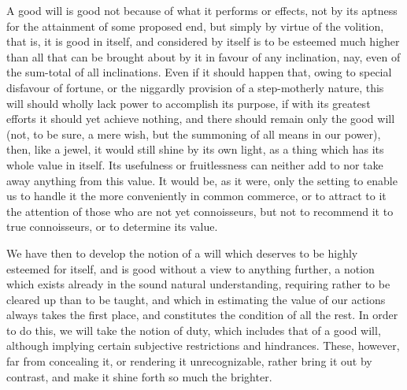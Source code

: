 A good will is good not because of what it performs or effects, not by
its aptness for the attainment of some proposed end, but simply by
virtue of the volition, that is, it is good in itself, and considered
by itself is to be esteemed much higher than all that can be brought
about by it in favour of any inclination, nay, even of the sum-total
of all inclinations. Even if it should happen that, owing to special
disfavour of fortune, or the niggardly provision of a step-motherly
nature, this will should wholly lack power to accomplish its purpose,
if with its greatest efforts it should yet achieve nothing, and there
should remain only the good will (not, to be sure, a mere wish, but
the summoning of all means in our power), then, like a jewel, it would
still shine by its own light, as a thing which has its whole value in
itself. Its usefulness or fruitlessness can neither add to nor take
away anything from this value. It would be, as it were, only the
setting to enable us to handle it the more conveniently in common
commerce, or to attract to it the attention of those who are not yet
connoisseurs, but not to recommend it to true connoisseurs, or to
determine its value.

\snip

We have then to develop the notion of a will which deserves
to be highly esteemed for itself, and is good without a view to
 anything further, a notion which exists already in the sound
natural understanding, requiring rather to be cleared up than to be
taught, and which in estimating the value of our actions always takes
the first place, and constitutes the condition of all the rest. In
order to do this, we will take the notion of duty, which includes that
of a good will, although implying certain subjective restrictions and
hindrances. These, however, far from concealing it, or rendering it
unrecognizable, rather bring it out by contrast, and make it shine
forth so much the brighter.

